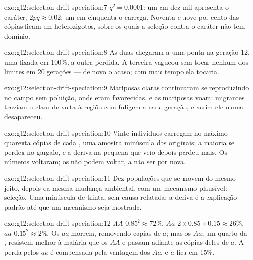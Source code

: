\begin{solution}{exo:g12:selection-drift-speciation:7}
$q^2 = 0.0001$: um em dez mil apresenta o caráter; $2pq \approx
0.02$: um em cinquenta o carrega. Noventa e nove por cento das cópias
ficam em heterozigotos, sobre os quais a seleção contra o caráter não
tem domínio.
\end{solution}

\begin{solution}{exo:g12:selection-drift-speciation:8}
As duas chegaram a uma ponta na geração 12, uma fixada em 100\%, a
outra perdida. A terceira vagueou sem tocar nenhum dos limites em 20
gerações --- de novo o acaso; com mais tempo ela tocaria.
\end{solution}

\begin{solution}{exo:g12:selection-drift-speciation:9}
Mariposas claras continuaram se reproduzindo no campo sem poluição,
onde eram favorecidas, e as mariposas voam: migrantes traziam o 
claro de volta à região com fuligem a cada geração, e assim ele nunca desapareceu.
\end{solution}

\begin{solution}{exo:g12:selection-drift-speciation:10}
Vinte indivíduos carregam no máximo quarenta cópias de cada , uma
amostra minúscula dos  originais; a maioria se perdeu no gargalo,
e a deriva na  pequena que veio depois perdeu mais. Os números
voltaram; os  não podem voltar, a não ser por  nova.
\end{solution}

\begin{solution}{exo:g12:selection-drift-speciation:11}
Dez populações que se movem do mesmo jeito, depois da mesma mudança
ambiental, com um mecanismo plausível: seleção. Uma  minúscula
de trinta, sem causa relatada: a deriva é a explicação padrão até que
um mecanismo seja mostrado.
\end{solution}

\begin{solution}{exo:g12:selection-drift-speciation:12}
$AA$ $0.85^2 \approx 72\%$, $Aa$ $2 \times 0.85 \times 0.15 \approx
26\%$, $aa$ $0.15^2 \approx 2\%$. Os $aa$ morrem, removendo cópias de
$a$; mas os $Aa$, um quarto da , resistem melhor à malária que
os $AA$ e passam adiante as cópias deles de $a$. A perda pelos $aa$ é
compensada pela vantagem dos $Aa$, e $a$ fica em 15\%.
\end{solution}

